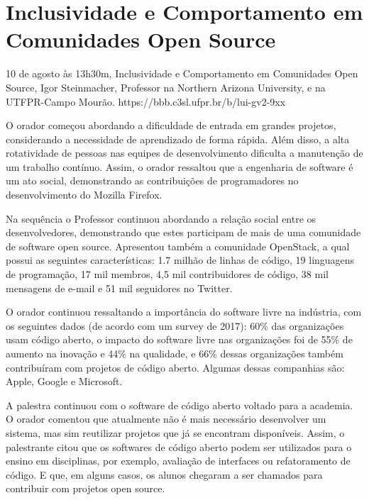 \section{Inclusividade e Comportamento em Comunidades Open Source}

\begin{center}
  \vspace{1cm}
  10 de agosto às 13h30m, Inclusividade e Comportamento em Comunidades Open Source, Igor Steinmacher, Professor na Northern Arizona University, e na UTFPR-Campo Mourão. https://bbb.c3sl.ufpr.br/b/lui-gv2-9xx
  \vspace{1cm}
\end{center}

O orador começou abordando a dificuldade de entrada em grandes projetos, considerando a necessidade de aprendizado de forma rápida. Além disso, a alta rotatividade de pessoas nas equipes de desenvolvimento dificulta a manutenção de um trabalho contínuo. Assim, o orador ressaltou que a engenharia de software é um ato social, demonstrando as contribuições de programadores no desenvolvimento do Mozilla Firefox.

Na sequência o Professor continuou abordando a relação social entre os desenvolvedores, demonstrando que estes participam de mais de uma comunidade de software open source. Apresentou também a comunidade OpenStack, a qual possui as seguintes características: 1.7 milhão de linhas de código, 19 linguagens de programação, 17 mil membros, 4,5 mil contribuidores de código, 38 mil mensagens de e-mail e 51 mil seguidores no Twitter.

O orador continuou ressaltando a importância do software livre  na indústria, com os seguintes dados (de acordo com um survey de 2017): 60\% das organizações usam código aberto, o impacto do software livre nas organizações foi de 55\% de aumento na inovação e 44\% na qualidade, e 66\% dessas organizações também contribuíram com projetos de código aberto. Algumas dessas companhias são: Apple, Google e Microsoft.

A palestra continuou com o software de código aberto voltado para a academia. O orador comentou que atualmente não é mais necessário desenvolver um sistema, mas sim reutilizar projetos que já se encontram disponíveis. Assim, o palestrante citou que os softwares de código aberto podem ser utilizados para o ensino em disciplinas, por exemplo, avaliação de interfaces ou refatoramento de código. E que, em alguns casos, os alunos chegaram a ser chamados para contribuir com projetos open source.

